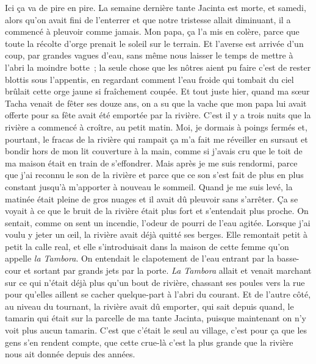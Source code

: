 	Ici ça va de pire en pire. La semaine dernière tante Jacinta est morte, et samedi, alors qu’on avait fini de l’enterrer et que notre tristesse allait diminuant, il a commencé à pleuvoir comme jamais. Mon papa, ça l’a mis en colère, parce que toute la récolte d’orge prenait le soleil sur le terrain. Et l’averse est arrivée d’un coup, par grandes vagues d’eau, sans même nous laisser le temps de mettre à l’abri la moindre botte ; la seule chose que les nôtres aient pu faire c’est de rester blottis sous l’appentis, en regardant comment l’eau froide qui tombait du ciel brûlait cette orge jaune si fraîchement coupée.
\pend
%
\pstart
	Et tout juste hier, quand ma sœur Tacha venait de fêter ses douze ans, on a su que la vache que mon papa lui avait offerte pour sa fête avait été emportée par la rivière.
\pend
%
\pstart
	C’est il y a trois nuits que la rivière a commencé à croître, au petit matin. Moi, je dormais à poings fermés et, pourtant, le fracas de la rivière qui rampait ça m’a fait me réveiller en sursaut et bondir hors de mon lit couverture à la main, comme si j’avais cru que le toit de ma maison était en train de s’effondrer. Mais après je me suis rendormi, parce que j’ai reconnu le son de la rivière et parce que ce son s’est fait de plus en plus constant jusqu’à m’apporter à nouveau le sommeil.
\pend
%
\pstart
	Quand je me suis levé, la matinée était pleine de gros nuages et il avait dû pleuvoir sans s’arrêter. Ça se voyait à ce que le bruit de la rivière était plus fort et s’entendait plus proche. On sentait, comme on sent un incendie, l’odeur de pourri de l’eau agitée.
\pend
%
\pstart
	Lorsque j’ai voulu y jeter un œil, la rivière avait déjà quitté ses berges. Elle remontait petit à petit la calle real, et elle s’introduisait dans la maison de cette femme qu’on appelle \textit{la Tambora}. On entendait le clapotement de l’eau entrant par la basse-cour et sortant par grands jets par la porte. \textit{La Tambora} allait et venait marchant sur ce qui n’était déjà plus qu’un bout de rivière, chassant ses poules vers la rue pour qu’elles aillent se cacher quelque-part à l’abri du courant.
\pend
%
\pstart
	Et de l’autre côté, au niveau du tournant, la rivière avait dû emporter, qui sait depuis quand, le tamarin qui était sur la parcelle de ma tante Jacinta, puisque maintenant on n’y voit plus aucun tamarin. C’est que c’était le seul au village, c’est pour ça que les gens s’en rendent compte, que cette crue-là c’est la plus grande que la rivière nous ait donnée depuis des années.
